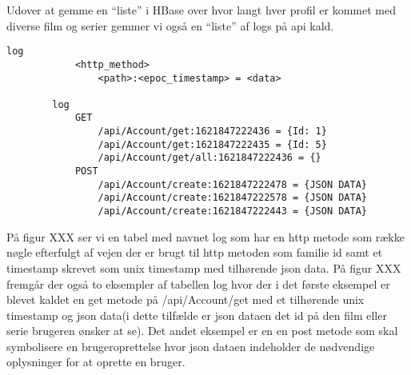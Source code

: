 Udover at gemme en “liste” i HBase over hvor langt hver profil er kommet med diverse film og serier gemmer vi også en “liste” af logs på api kald.

\begin{tcolorbox}
    \lstset{style=htmlstyle}
    \begin{lstlisting}[language={[Sharp]C}, caption={Logs HBASE Model}, label={lst:log}]
        log
            <http_method>
                <path>:<epoc_timestamp> = <data>
    
        log
            GET
                /api/Account/get:1621847222436 = {Id: 1}
                /api/Account/get:1621847222435 = {Id: 5}
                /api/Account/get/all:1621847222436 = {}
            POST
                /api/Account/create:1621847222478 = {JSON DATA}
                /api/Account/create:1621847222578 = {JSON DATA}
                /api/Account/create:1621847222443 = {JSON DATA}
    \end{lstlisting}
\end{tcolorbox}
På figur XXX ser vi en tabel med navnet log som har en http metode som række nøgle efterfulgt af vejen der er brugt til http metoden som familie id samt et timestamp skrevet som unix timestamp med tilhørende json data. På figur XXX fremgår der også to eksempler af tabellen log hvor der i det første eksempel er blevet kaldet en get metode på /api/Account/get med et tilhørende unix timestamp og json data(i dette tilfælde er json dataen det id på den film eller serie brugeren ønsker at se). Det andet eksempel er en en post metode som skal symbolisere en brugeroprettelse hvor json dataen indeholder de nødvendige oplysninger for at oprette en bruger.